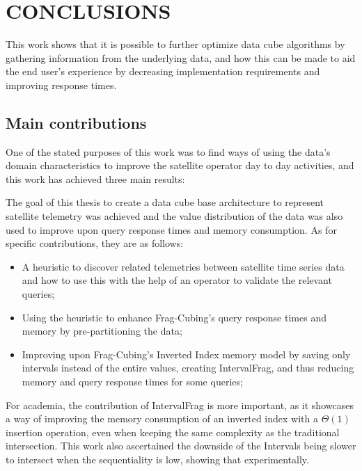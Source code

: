 
\chapter{CONCLUSIONS}\label{ch:concl}

This work shows that it is possible to further optimize data cube algorithms by gathering information from the underlying data, and how this can be made to aid the end user's experience by decreasing implementation requirements and improving response times.

\section{Main contributions}\label{ch:concl:contrib}

One of the stated purposes of this work was to find ways of using the data's domain characteristics to improve the satellite operator day to day activities, and this work has achieved three main results:

The goal of this thesis to create a data cube base architecture to represent satellite telemetry was achieved and the value distribution of the data was also used to improve upon query response times and memory consumption.
As for specific contributions, they are as follows:

\begin{itemize}[noitemsep]
\item A heuristic to discover related telemetries between satellite time series data and how to use this with the help of an operator to validate the relevant queries;
\item Using the heuristic to enhance Frag-Cubing's query response times and memory by pre-partitioning the data;
\item Improving upon Frag-Cubing's Inverted Index memory model by saving only intervals instead of the entire values, creating IntervalFrag, and thus reducing memory and query response times for some queries;
\end{itemize}

For academia, the contribution of IntervalFrag is more important, as it showcases a way of improving the memory consumption of an inverted index with a $\Theta(1)$ insertion operation, even when keeping the same complexity as the traditional intersection.
This work also ascertained the downside of the Intervals being slower to intersect when the sequentiality is low, showing that experimentally.

